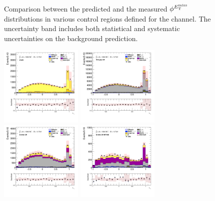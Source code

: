 \begin{figure}[!htp]
\begin{center}
			\end{center}
			\caption{
			Comparison between the predicted and the measured $\phi^{E_\text{T}^\text{miss}}$ distributions in various control regions defined for the \taujets channel. The uncertainty band includes both statistical and systematic uncertainties on the background prediction. 
			}
			\label{fig:bkg-met-phi-taujets}
		\end{figure}

		\begin{figure}[!htp]
			\begin{center}    
			\includegraphics[width=0.35\textwidth]{chapters/chapter6_HPlus/images/taujets/tau_0_upsilon_TTBAR.png}
			\includegraphics[width=0.35\textwidth]{chapters/chapter6_HPlus/images/taujets/tau_0_upsilon_WJETS.png} \\
			\includegraphics[width=0.35\textwidth]{chapters/chapter6_HPlus/images/taujets/tau_0_upsilon_BVETO.png}
			\includegraphics[width=0.35\textwidth]{chapters/chapter6_HPlus/images/taujets/tau_0_upsilon_BVETO_MT100.png} \\

\end{center}
\end{figure}
